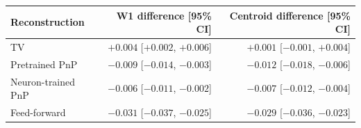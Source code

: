 \begin{tabular}{lrr}
\toprule
Reconstruction & W1 difference [95\% CI] & Centroid difference [95\% CI] \\
\midrule
TV & $+0.004$ [$+0.002$, $+0.006$] & $+0.001$ [$-0.001$, $+0.004$] \\
Pretrained PnP & $-0.009$ [$-0.014$, $-0.003$] & $-0.012$ [$-0.018$, $-0.006$] \\
Neuron-trained PnP & $-0.006$ [$-0.011$, $-0.002$] & $-0.007$ [$-0.012$, $-0.004$] \\
Feed-forward & $-0.031$ [$-0.037$, $-0.025$] & $-0.029$ [$-0.036$, $-0.023$] \\
\bottomrule
\end{tabular}
